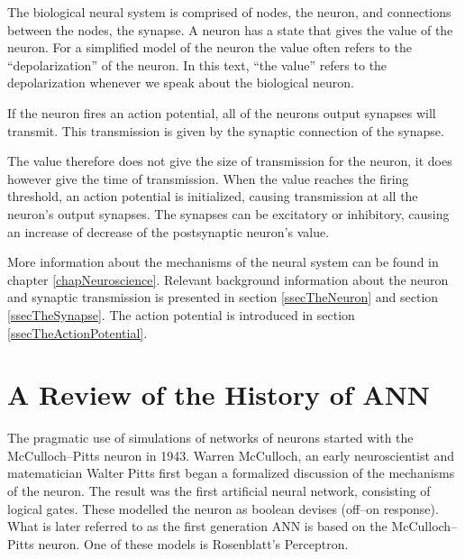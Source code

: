 The biological neural system is comprised of nodes, the neuron, and connections between the nodes, the synapse.
A neuron has a state that gives the value of the neuron. 
For a simplified model of the neuron the value often refers to the ``depolarization'' of the neuron. %
In this text, ``the value'' refers to the depolarization whenever we speak about the biological neuron.

If the neuron fires an action potential, all of the neurons output synapses will transmit. 
This transmission is given by the synaptic connection of the synapse.

The value therefore does not give the size of transmission for the neuron, it does however give the time of transmission.
When the value reaches the firing threshold, an action potential is initialized, causing transmission at all the neuron's output synapses.
The synapses can be excitatory or inhibitory, causing an increase of decrease of the postsynaptic neuron's value.

More information about the mechanisms of the neural system can be found in chapter \ref{chapNeuroscience}. 
Relevant background information about the neuron and synaptic transmission is presented in section \ref{ssecTheNeuron} and section \ref{ssecTheSynapse}. 
The action potential is introduced in section \ref{ssecTheActionPotential}.


\section{A Review of the History of ANN}
The pragmatic use of simulations of networks of neurons started with the McCulloch--Pitts neuron in 1943. 
Warren McCulloch, an early neuroscientist and matematician Walter Pitts first began a formalized discussion of the mechanisms of the neuron.
The result was the first artificial neural network, consisting of logical gates. These modelled the neuron as boolean devises (off--on response)\cite{MccullochPittsHistorie}. %
What is later referred to as the first generation ANN is based on the McCulloch--Pitts neuron\cite{Maass97networksof}.
One of these models is Rosenblatt's Perceptron\cite{HaykinANNbok}.%

